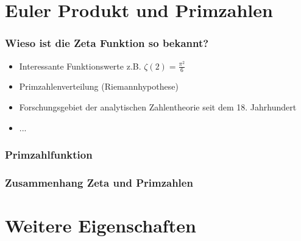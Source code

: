 \documentclass[ngerman, aspectratio=169]{beamer}
\begin{document}
    \section{Euler Produkt und Primzahlen}
    \begin{frame}
        \frametitle{Wieso ist die Zeta Funktion so bekannt?}
        \begin{itemize}
            \item Interessante Funktionswerte z.B. $\zeta(2) = \frac{\pi^2}{6}$
            \item Primzahlenverteilung (Riemannhypothese)
            \item Forschungsgebiet der analytischen Zahlentheorie seit dem 18. Jahrhundert
            \item ...
        \end{itemize}
    \end{frame}
    \begin{frame}
        \frametitle{Primzahlfunktion}
        \begin{center}
           \scalebox{0.5}{}
        \end{center}
    \end{frame}
    \begin{frame}
        \frametitle{Zusammenhang Zeta und Primzahlen}
    \end{frame}


    \section{Weitere Eigenschaften}
\end{document}

